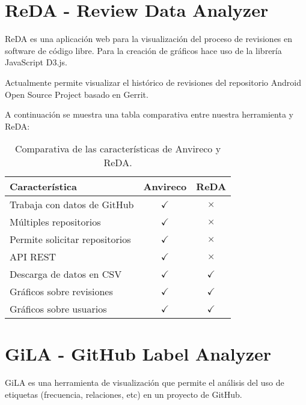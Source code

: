 \section{ReDA - Review Data Analyzer}

ReDA \cite{reda2014} es una aplicación web para la visualización del proceso de revisiones en software de código libre. Para la creación de gráficos hace uso de la librería JavaScript D3.js.

Actualmente permite visualizar el histórico de revisiones del repositorio Android Open Source Project basado en Gerrit.

A continuación se muestra una tabla comparativa entre nuestra herramienta y ReDA:

\begin{table}[H]
\centering
\begin{tabular}{lcc}
\toprule
Característica & Anvireco & ReDA \\
\midrule
Trabaja con datos de GitHub & \cellcolor{green!25} {$\checkmark$} & \cellcolor{red!25} {$\times$} \\
Múltiples repositorios & \cellcolor{green!25} {$\checkmark$} & \cellcolor{red!25} {$\times$} \\
Permite solicitar repositorios & \cellcolor{green!25} {$\checkmark$} & \cellcolor{red!25} {$\times$} \\
API REST & \cellcolor{green!25} {$\checkmark$} & \cellcolor{red!25} {$\times$} \\
Descarga de datos en CSV & \cellcolor{green!25} {$\checkmark$} & \cellcolor{green!25} {$\checkmark$} \\
Gráficos sobre revisiones & \cellcolor{green!25} {$\checkmark$} & \cellcolor{green!25} {$\checkmark$} \\
Gráficos sobre usuarios & \cellcolor{green!25} {$\checkmark$} & \cellcolor{green!25} {$\checkmark$} \\
\bottomrule
\end{tabular}
\caption{Comparativa de las características de Anvireco y ReDA.}
\label{comparativa-anvireco-reda}
\end{table}

\section{GiLA - GitHub Label Analyzer}

GiLA \cite{gila} es una herramienta de visualización que permite el análisis del uso de etiquetas (frecuencia, relaciones, etc) en un proyecto de GitHub.


